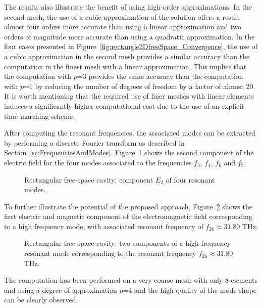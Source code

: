 The results also illustrate the benefit of using high-order approximations. In the second mesh, the use of a cubic approximation of the solution offers a result almost four orders more accurate than using a linear approximation and two orders of magnitude more accurate than using a quadratic approximation. In the four cases presented in Figure~\ref{fig:rectangle2DfreeSpace_Convergence}, the use of a cubic approximation in the second mesh provides a similar accuracy than the computation in the finest mesh with a linear approximation. This implies that the computation with $p$=3 provides the same accuracy than the computation with $p$=1 by reducing the number of degrees of freedom by a factor of almost 20. It is worth mentioning that the required use of finer meshes with linear elements induces a significantly higher computational cost due to the use of an explicit time marching scheme.

After computing the resonant frequencies, the associated modes can be extracted by performing a discrete Fourier transform as described in Section~\ref{sc:FrequenciesAndModes}. Figure~\ref{fig:rectangle2DfreeSpace_modes} shows the second component of the electric field for the four modes associated to the frequencies $f_3$, $f_4$, $f_6$ and $f_9$.
\begin{figure}[!ht]
	\centering
	\caption{Rectangular free-space cavity: component $E_2$ of four resonant modes.}
	\label{fig:rectangle2DfreeSpace_modes}
\end{figure}

To further illustrate the potential of the proposed approach, Figure~\ref{fig:rectangle2DfreeSpace_modesHF} shows the first electric and magnetic component of the electromagnetic field corresponding to a high frequency mode, with associated resonant frequency of $f_{26} \approx 31.80$ THz. 
\begin{figure}[!ht]
	\centering
	\hspace{1cm}
	\caption{Rectangular free-space cavity: two components of a high frequency resonant mode corresponding to the resonant frequency $f_{26} \approx 31.80$ THz.}
	\label{fig:rectangle2DfreeSpace_modesHF}
\end{figure}
The computation has been performed on a very coarse mesh with only 8 elements and using a degree of approximation $p$=4 and the high quality of the mode shape can be clearly observed.

